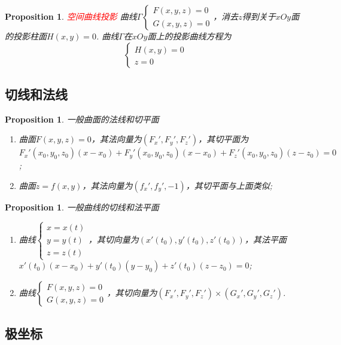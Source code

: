 \documentclass{article}
\newtheorem{proposition}[theorem]{Proposition}
\newcommand{\redt}[1]{\textcolor{red}{#1}}
\begin{document}
\begin{proposition}
\rm \redt{空间曲线投影} 曲线$\Gamma \left\{\begin{array}{ll} F(x,y,z) = 0 \\ G(x,y,z) = 0 \end{array}\right.$，消去$z$得到关于$xOy$面的投影柱面$H(x,y)=0$. 曲线$\Gamma$在$xOy$面上的投影曲线方程为
$$
\left \{
\begin{array}{ll}
H(x,y) = 0\\
z = 0
\end{array} \right. 
$$
\end{proposition}


\subsection{切线和法线}

\begin{proposition}
\rm 一般曲面的法线和切平面
\begin{enumerate}
	\item 曲面$F(x,y,z) = 0$，其法向量为$(F_x',F_y',F_z')$，其切平面为$F_x'(x_0,y_0,z_0)(x-x_0) + F_y'(x_0,y_0,z_0)(x-x_0) + F_z'(x_0,y_0,z_0)(z-z_0)= 0$;
	\item 曲面$z=f(x,y)$，其法向量为$(f_x',f_y',-1)$，其切平面与上面类似;
\end{enumerate}
\end{proposition}

\begin{proposition}
\rm 一般曲线的切线和法平面
\begin{enumerate}
	\item 曲线$\left\{ \begin{array}{ll} x=x(t) \\ y=y(t) \\ z=z(t) \end{array}	 \right.$，其切向量为$(x'(t_0),y'(t_0),z'(t_0))$，其法平面$x'(t_0)(x-x_0)+y'(t_0)(y-y_0) + z'(t_0)(z-z_0) = 0$; 
	\item 曲线$\left\{ \begin{array}{ll} F(x,y,z) = 0 \\ G(x,y,z) = 0 \end{array} \right.$，其切向量为$(F_x',F_y',F_z') \times (G_x',G_y',G_z')$. 
\end{enumerate}
\end{proposition}

\subsection{极坐标}
\end{document}
